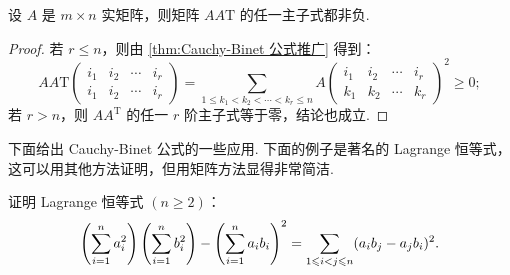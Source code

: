 \begin{corollary}{}{}
    设 $A$ 是 $m \times n$ 实矩阵，则矩阵 $AA\mathrm{T}$ 的任一主子式都非负.
\end{corollary}

\begin{proof}
    若 $r \leqslant n$，则由 \autoref{thm:Cauchy-Binet 公式推广} 得到：
    $$ AA\mathrm{T}
    \begin{pmatrix}
        i_1 & i_2 & \cdots & i_r \\
        i_1 & i_2 & \cdots & i_r
    \end{pmatrix}
    = \sum_{1 \leqslant k_1 < k_2 < \cdots < k_r \leqslant n} A
    \begin{pmatrix}
        i_1 & i_2 & \cdots & i_r \\
        k_1 & k_2 & \cdots & k_r
    \end{pmatrix}^2 \geqslant 0; $$
    若 $r > n$，则 $AA^\mathrm{T}$ 的任一 $r$ 阶主子式等于零，结论也成立.
\end{proof}

下面给出 Cauchy-Binet 公式的一些应用. 下面的例子是著名的 Lagrange 恒等式，这可以用其他方法证明，但用矩阵方法显得非常简洁.

\begin{example}{}{}
    证明 Lagrange 恒等式 $(n \geqslant 2)$：
    $$ \left( \sum_{i=1}^{n}\limits a_i^2 \right) \left( \sum_{i=1}^{n}\limits b_i^2 \right) - \left( \sum_{i=1}^{n}\limits a_i b_i \right)^2 = \sum_{1 \leqslant i < j \leqslant n} (a_i b_j - a_j b_i)^2. $$
\end{example}

